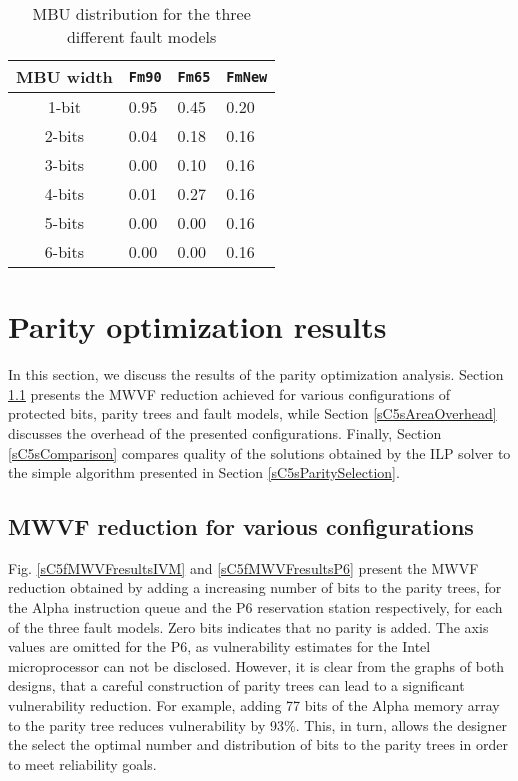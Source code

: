 \documentclass[12pt]{yalephd}
\begin{document}
\begin{table}[!ht]
\caption{MBU distribution for the three different fault models}
\label{sC5tFaultModels}
\begin{center}
\begin{tabular}{||c|l|l|l||}
\hline
\hline
MBU width & {\tt Fm90} & {\tt Fm65} & {\tt FmNew} \\
\hline
1-bit & 0.95 & 0.45 & 0.20 \\
\hline
2-bits & 0.04 & 0.18 & 0.16 \\
\hline
3-bits & 0.00 & 0.10 & 0.16 \\
\hline
4-bits & 0.01 & 0.27 & 0.16 \\
\hline
5-bits & 0.00 & 0.00 & 0.16 \\
\hline
6-bits & 0.00 & 0.00 & 0.16 \\
\hline
\hline
\end{tabular}
\end{center}
\end{table}

\section{Parity optimization results}\label{sC5sResults}

In this section, we discuss the results of the parity optimization analysis. Section \ref{sC5sMWVFreduction} presents the MWVF reduction achieved for various configurations of protected bits, parity trees and fault models, while Section \ref{sC5sAreaOverhead} discusses the overhead of the presented configurations. Finally, Section \ref{sC5sComparison} compares quality of the solutions obtained by the ILP solver to the simple algorithm presented in Section \ref{sC5sParitySelection}.

\subsection{MWVF reduction for various configurations}\label{sC5sMWVFreduction}

 Fig. \ref{sC5fMWVFresultsIVM} and \ref{sC5fMWVFresultsP6} present the MWVF reduction obtained by adding a increasing number of bits to the parity trees, for the Alpha instruction queue and the P6 reservation station respectively, for each of the three fault models. Zero bits indicates that no parity is added. The axis values are omitted for the P6, as vulnerability estimates for the Intel microprocessor can not be disclosed. However, it is clear from the graphs of both designs, that a careful construction of parity trees can lead to a significant vulnerability reduction. For example, adding 77 bits of the Alpha memory array to the parity tree reduces vulnerability by 93\%. This, in turn, allows the designer the select the optimal number and distribution of bits to the parity trees in order to meet reliability goals.
\end{document}
